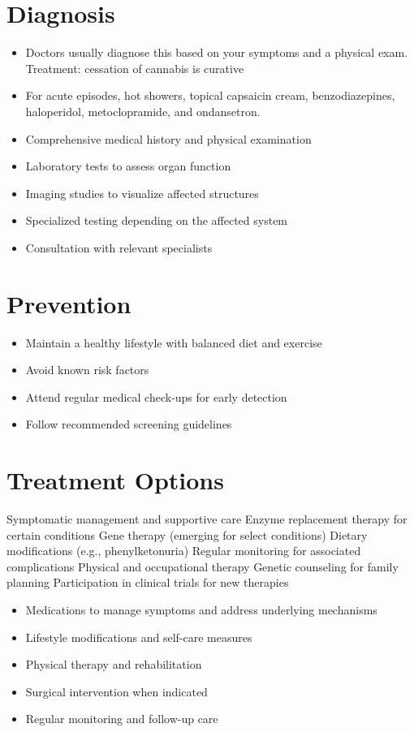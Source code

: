 \section{Diagnosis}
\begin{itemize}[noitemsep]
  \item Doctors usually diagnose this based on your symptoms and a physical exam. Treatment: cessation of cannabis is curative
  \item For acute episodes, hot showers, topical capsaicin cream, benzodiazepines, haloperidol, metoclopramide, and ondansetron.
  \item Comprehensive medical history and physical examination
  \item Laboratory tests to assess organ function
  \item Imaging studies to visualize affected structures
  \item Specialized testing depending on the affected system
  \item Consultation with relevant specialists
\end{itemize}
\section{Prevention}
\begin{itemize}[noitemsep]
  \item Maintain a healthy lifestyle with balanced diet and exercise
  \item Avoid known risk factors
  \item Attend regular medical check-ups for early detection
  \item Follow recommended screening guidelines
\end{itemize}
\section{Treatment Options}
Symptomatic management and supportive care Enzyme replacement therapy for certain conditions Gene therapy (emerging for select conditions) Dietary modifications (e.g., phenylketonuria) Regular monitoring for associated complications Physical and occupational therapy Genetic counseling for family planning Participation in clinical trials for new therapies

\begin{itemize}[noitemsep]
  \item Medications to manage symptoms and address underlying mechanisms
  \item Lifestyle modifications and self-care measures
  \item Physical therapy and rehabilitation
  \item Surgical intervention when indicated
  \item Regular monitoring and follow-up care
\end{itemize}
